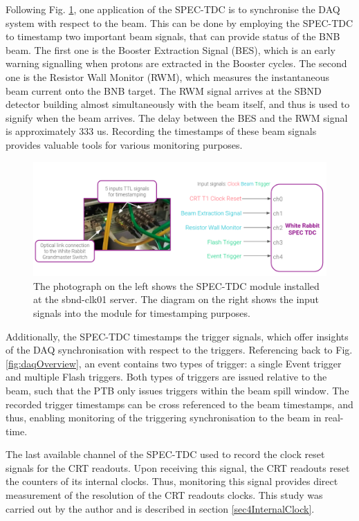 Following Fig. \ref{fig:SPECTDC}, one application of the SPEC-TDC is to synchronise the DAQ system with respect to the beam.
This can be done by employing the SPEC-TDC to timestamp two important beam signals, that can provide status of the BNB beam.
The first one is the Booster Extraction Signal (BES), which is an early warning signalling when protons are extracted in the Booster cycles.
The second one is the Resistor Wall Monitor (RWM), which measures the instantaneous beam current onto the BNB target.
The RWM signal arrives at the SBND detector building almost simultaneously with the beam itself, and thus is used to signify when the beam arrives.
The delay between the BES and the RWM signal is approximately 333 us.
Recording the timestamps of these beam signals provides valuable tools for various monitoring purposes. 

\begin{figure}[htbp!] 
\centering    
\includegraphics[width=1.0\textwidth]{SPEC_TDC}
\caption[SPECTDC]{
The photograph on the left shows the SPEC-TDC module installed at the sbnd-clk01 server.
The diagram on the right shows the input signals into the module for timestamping purposes.
}
\label{fig:SPECTDC}
\end{figure}

Additionally, the SPEC-TDC timestamps the trigger signals, which offer insights of the DAQ synchronisation with respect to the triggers. 
Referencing back to Fig. \ref{fig:daqOverview}, an event contains two types of trigger: a single Event trigger and multiple Flash triggers. 
Both types of triggers are issued relative to the beam, such that the PTB only issues triggers within the beam spill window.   
The recorded trigger timestamps can be cross referenced to the beam timestamps, and thus, enabling monitoring of the triggering synchronisation to the beam in real-time.

The last available channel of the SPEC-TDC used to record the clock reset signals for the CRT readouts. 
Upon receiving this signal, the CRT readouts reset the counters of its internal clocks.
Thus, monitoring this signal provides direct measurement of the resolution of the CRT readouts clocks.
This study was carried out by the author and is described in section \ref{sec4InternalClock}.

